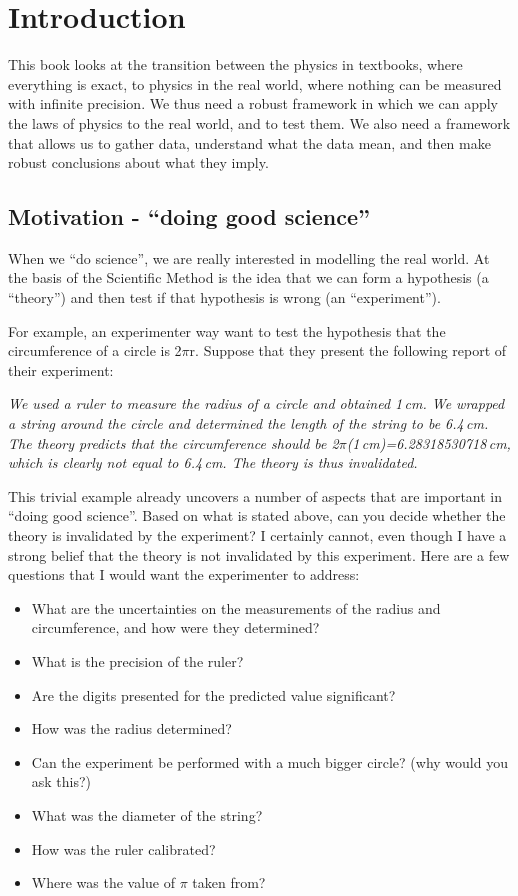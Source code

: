 \chapter{Introduction}
\label{chap:Intro}

This book looks at the transition between the physics in textbooks, where everything is exact, to physics in the real world, where nothing can be measured with infinite precision. We thus need a robust framework in which we can apply the laws of physics to the real world, and to test them. We also need a framework that allows us to gather data, understand what the data mean, and then make robust conclusions about what they imply. 

\section{Motivation - ``doing good science''}
When we ``do science'', we are really interested in modelling the real world. At the basis of the Scientific Method is the idea that we can form a hypothesis (a ``theory'') and then test if that hypothesis is wrong (an ``experiment''). 

For example, an experimenter way want to test the hypothesis that the circumference of a circle is 2$\pi$r. Suppose that they present the following report of their experiment:

\textit{We used a ruler to measure the radius of a circle and obtained 1\,cm. We wrapped a string around the circle and determined the length of the string to be 6.4\,cm. The theory predicts that the circumference should be 2$\pi$(1\,cm)=6.28318530718\,cm, which is clearly not equal to 6.4\,cm. The theory is thus invalidated.}

This trivial example already uncovers a number of aspects that are important in ``doing good science''.  Based on what is stated above, can you decide whether the theory is invalidated by the experiment? I certainly cannot, even though I have a strong belief that the theory is not invalidated by this experiment. Here are a few questions that I would want the experimenter to address:
\begin{itemize}
\item What are the uncertainties on the measurements of the radius and circumference, and how were they determined?
\item What is the precision of the ruler?
\item Are the digits presented for the predicted value significant?
\item How was the radius determined?
\item Can the experiment be performed with a much bigger circle? (why would you ask this?)
\item What was the diameter of the string?
\item How was the ruler calibrated? 
\item Where was the value of $\pi$ taken from?
\end{itemize}

